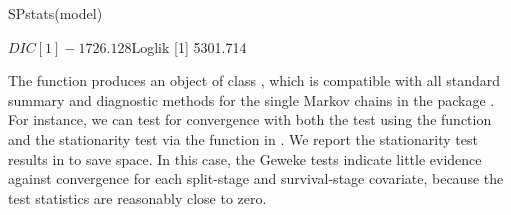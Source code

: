 \begin{example}
SPstats(model)

$DIC
[1] -1726.128

$Loglik
[1] 5301.714

\end{example}

The  function produces an object of class , which is compatible with all standard summary and diagnostic methods for the single Markov chains in the  package \citep{coda-manual}. For instance, we can test for convergence with both the  \citet{geweke1992} test using the  function and the \citet{heidelberger1983} stationarity test via the  function in . We report the \citet{heidelberger1983} stationarity test results in \citet{Bolte2021} to save space. In this case, the Geweke tests indicate little evidence against convergence for each split-stage and survival-stage covariate, because the test statistics are reasonably close to zero.


